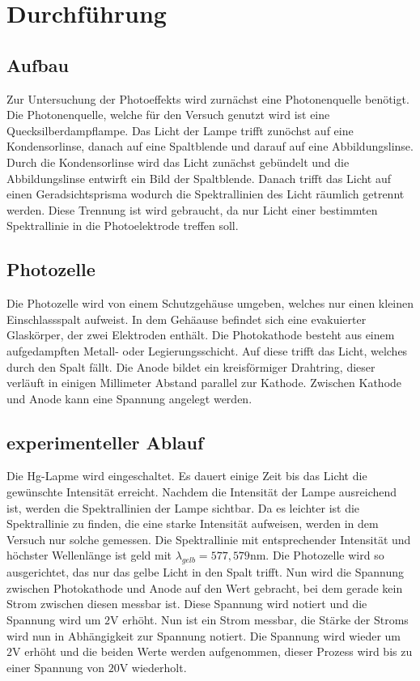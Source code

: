 \section{Durchführung}
\label{sec:Durchführung}
\subsection{Aufbau}
Zur Untersuchung der Photoeffekts wird zurnächst eine Photonenquelle benötigt.
Die Photonenquelle, welche für den Versuch genutzt wird ist eine Quecksilberdampflampe.
Das Licht der Lampe trifft zunöchst auf eine Kondensorlinse, danach auf eine Spaltblende und darauf auf eine Abbildungslinse.
Durch die Kondensorlinse wird das Licht zunächst gebündelt und die Abbildungslinse entwirft ein Bild der Spaltblende.
Danach trifft das Licht auf einen Geradsichtsprisma wodurch die Spektrallinien des Licht räumlich getrennt werden.
Diese Trennung ist wird gebraucht, da nur Licht einer bestimmten Spektrallinie in die Photoelektrode treffen soll.

\subsection{Photozelle}
Die Photozelle wird von einem Schutzgehäuse umgeben, welches nur einen kleinen Einschlassspalt aufweist.
In dem Gehäause befindet sich eine evakuierter Glaskörper, der zwei Elektroden enthält.
Die Photokathode besteht aus einem aufgedampften Metall- oder Legierungsschicht.
Auf diese trifft das Licht, welches durch den Spalt fällt.
Die Anode bildet ein kreisförmiger Drahtring, dieser verläuft in einigen Millimeter Abstand parallel zur Kathode.
Zwischen Kathode und Anode kann eine Spannung angelegt werden.

\subsection{experimenteller Ablauf}
Die Hg-Lapme wird eingeschaltet.
Es dauert einige Zeit bis das Licht die gewünschte Intensität erreicht.
Nachdem die Intensität der Lampe ausreichend ist, werden die Spektrallinien der Lampe sichtbar.
Da es leichter ist die Spektrallinie zu finden, die eine starke Intensität aufweisen, werden in dem Versuch nur solche gemessen.
Die Spektrallinie mit entsprechender Intensität und höchster Wellenlänge ist geld mit $\lambda_{gelb} = 577,579 \si{\nano\meter}$.
Die Photozelle wird so ausgerichtet, das nur das gelbe Licht in den Spalt trifft.
Nun wird die Spannung zwischen Photokathode und Anode auf den Wert gebracht, bei dem gerade kein Strom zwischen diesen messbar ist.
Diese Spannung wird notiert und die Spannung wird um $2\si{\V}$ erhöht.
Nun ist ein Strom messbar, die Stärke der Stroms wird nun in Abhängigkeit zur Spannung notiert.
Die Spannung wird wieder um $2\si{\V}$ erhöht und die beiden Werte werden aufgenommen, dieser Prozess wird bis zu einer Spannung von $20\si{\V}$ wiederholt.


